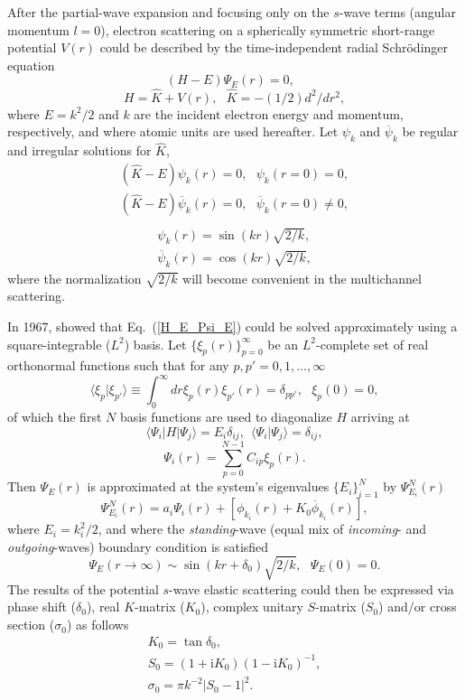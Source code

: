 \documentclass[aip
, pra
, showpacs
, aps
, twocolumn
, groupedaddress
, floatfix
]{revtex4}
\newcommand{\beq}{\begin{equation}}
\newcommand{\eeq}{\end{equation}}
\newcommand{\barr}{\begin{array}}
\newcommand{\earr}{\end{array}}
\begin{document}
After the partial-wave expansion \cite{Taylor72,N82} and focusing only on the $s$-wave terms (angular momentum $l=0$),
electron scattering on a spherically symmetric short-range potential $V(r)$
could be described by the time-independent radial Schr\"odinger equation
\beq
(H-E) \Psi_E (r) =0,  \ \ \  \label{H_E_Psi_E}
\eeq
\beq
H = \hat{K} + V(r), \ \ \ \hat{K} = -(1/2) d^2/dr^2,
\eeq
where $E=k^2/2$ and $k$ are the incident electron energy and momentum, respectively, and where
atomic units are used hereafter.
Let $\psi_k$ and $\overline{\psi}_k$ be regular and irregular solutions for $\hat{K}$,
\beq \barr{l}
(\hat{K}-E)  \psi_k (r) =0,  \ \ \ \psi_k(r=0) = 0,\\
(\hat{K}-E)  \overline{\psi}_k (r) =0,  \ \ \ \overline{\psi}_k(r=0) \neq 0,\\
\earr \label{H_0_E_psi}\eeq
\beq \barr{l}
\psi_k(r) = \sin(kr) \sqrt{2/k},\\
\overline{\psi}_k(r) = \cos(kr) \sqrt{2/k},
\earr \label{K} \eeq
where the normalization $\sqrt{2/k}$ will become convenient in the multichannel scattering.



In 1967, \citet{Harris67} showed that Eq.~(\ref{H_E_Psi_E}) could be solved
approximately using a square-integrable ($L^2$) basis.
Let $\{\xi_p(r)\}_{p=0}^\infty$ be an $L^2$-complete set of real orthonormal functions
such that for any $p,p'=0,1,...,\infty$
\beq
\langle \xi_p | \xi_{p'} \rangle \equiv \int_0^\infty dr \xi_p(r) \xi_{p'}(r) =\delta_{pp'}, \ \ \ \xi_p(0)=0,
\eeq
of which the first $N$ basis functions are used to diagonalize $H$ arriving at
\beq
\langle \Psi_i |H| \Psi_j \rangle = E_i \delta_{ij} , \ \ \langle \Psi_i | \Psi_j \rangle=\delta_{ij},
\eeq
\beq
\Psi_i(r) = \sum_{p=0}^{N-1} C_{ip} \xi_p(r).
\eeq
Then $\Psi_E(r)$ is approximated at the system's eigenvalues $\{E_i\}_{i=1}^{N}$ by $\Psi^N_{E_i}(r)$
\cite{Harris67}
\beq
\Psi^N_{E_i}(r) = a_i \Psi_i(r)  + [\phi_{k_i}(r)  + K_{0} \overline{\phi}_{k_i}(r)],
\label{Psi_EES} \eeq
where $E_i=k_i^2/2$, and where the {\em standing}-wave (equal mix of {\em incoming}- and {\em outgoing}-waves) boundary condition is satisfied
\beq
\Psi_E(r \rightarrow \infty) \sim  \sin(kr+\delta_0) \sqrt{2/k}, \ \ \ \Psi_E(0)=0.   \label{stand_wave}
\eeq
The results of the potential $s$-wave elastic scattering could then be expressed via
phase shift ($\delta_0$), real $K$-matrix ($K_0$), complex unitary $S$-matrix ($S_{0}$) and/or cross section ($\sigma_{0}$)
as follows
\beq \barr{l}
K_{0} = \tan{\delta_0},\\
S_{0}=(1+\mbox{i}K_0)(1-\mbox{i}K_0)^{-1}, \\
\sigma_{0}=\pi k^{-2} |S_{0}-1|^2.
\earr \eeq
\end{document}
